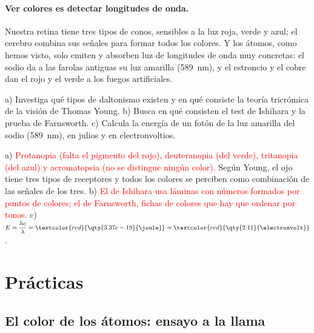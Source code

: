 \paragraph{Ver colores es detectar longitudes de onda.} Nuestra retina tiene tres tipos de conos, sensibles a la luz roja, verde y
azul; el cerebro combina sus señales para formar todos los colores. Y los átomos, como hemos visto, solo emiten y absorben luz
de longitudes de onda muy concretas: el sodio da a las farolas antiguas su luz amarilla (\qty{589}{\nm}), y el estroncio y el
cobre dan el rojo y el verde a los fuegos artificiales.

\begin{exercise}
    a) Investiga qué tipos de daltonismo existen y en qué consiste la teoría tricrómica de la visión de Thomas Young. b) Busca en
    qué consisten el test de Ishihara y la prueba de Farnsworth. c) Calcula la energía de un fotón de la luz amarilla del sodio
    (\qty{589}{\nm}), en julios y en electronvoltios.
    \begin{solu}
        a) \textcolor{red}{Protanopia (falta el pigmento del rojo), deuteranopia (del verde), tritanopia (del azul) y
        acromatopsia (no se distingue ningún color).} Según Young, el ojo tiene tres tipos de receptores y todos los colores se
        perciben como combinación de las señales de los tres. b) \textcolor{red}{El de Ishihara usa láminas con números formados
        por puntos de colores; el de Farnsworth, fichas de colores que hay que ordenar por tonos.}
        c) \(E = \dfrac{h c}{\lambda} = \textcolor{red}{\qty{3.37e-19}{\joule}} = \textcolor{red}{\qty{2.11}{\electronvolt}}\).
    \end{solu}
\end{exercise}

\section{Prácticas}\label{sec:ud3-practicas}

\subsection{El color de los átomos: ensayo a la llama}


